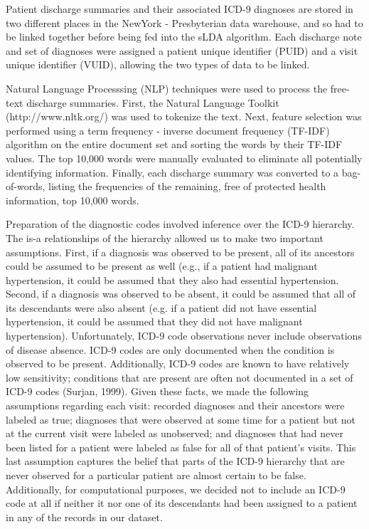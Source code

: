 \documentclass{article}
\begin{document}
Patient discharge summaries and their associated ICD-9 diagnoses are
stored in two different places in the NewYork - Presbyterian data
warehouse, and so had to be linked together before being fed into
the sLDA algorithm. Each discharge note and set of diagnoses were
assigned a patient unique identifier (PUID) and a visit unique identifier
(VUID), allowing the two types of data to be linked.

Natural Language Processsing (NLP) techniques were used to process
the free-text discharge summaries. First, the Natural Language Toolkit
(http://www.nltk.org/) was used to tokenize the text. Next, feature
selection was performed using a term frequency - inverse document
frequency (TF-IDF) algorithm on the entire document set and sorting
the words by their TF-IDF values. The top 10,000 words were manually
evaluated to eliminate all potentially identifying information. Finally,
each discharge summary was converted to a bag-of-words, listing the
frequencies of the remaining, free of protected health information,
top 10,000 words.

Preparation of the diagnostic codes involved inference over the ICD-9
hierarchy. The is-a relationships of the hierarchy allowed us to make
two important assumptions. First, if a diagnosis was observed to be
present, all of its ancestors could be assumed to be present as well
(e.g., if a patient had malignant hypertension, it could be assumed
that they also had essential hypertension. Second, if a diagnosis
was observed to be absent, it could be assumed that all of its descendants
were also absent (e.g. if a patient did not have essential hypertension,
it could be assumed that they did not have malignant hypertension).
Unfortunately, ICD-9 code observations never include observations
of disease absence. ICD-9 codes are only documented when the condition
is observed to be present. Additionally, ICD-9 codes are known to
have relatively low sensitivity; conditions that are present are often
not documented in a set of ICD-9 codes (Surjan, 1999). Given these
facts, we made the following assumptions regarding each visit: recorded
diagnoses and their ancestors were labeled as true; diagnoses that
were observed at some time for a patient but not at the current visit
were labeled as unobserved; and diagnoses that had never been listed
for a patient were labeled as false for all of that patient\textquoteright{}s
visits. This last assumption captures the belief that parts of the
ICD-9 hierarchy that are never observed for a particular patient are
almost certain to be false. Additionally, for computational purposes,
we decided not to include an ICD-9 code at all if neither it nor one
of its descendants had been assigned to a patient in any of the records
in our dataset.
\end{document}
